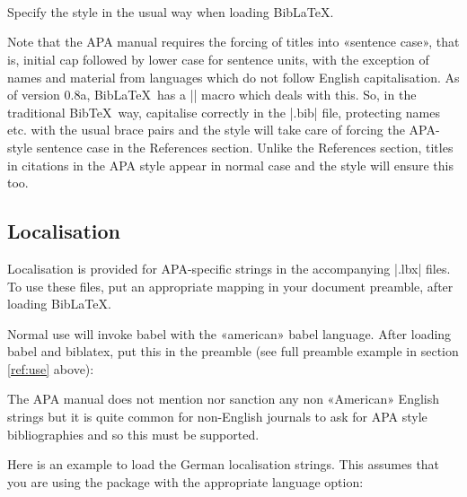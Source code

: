 \documentclass{ltxdockit}
\begin{document}
\noindent{}\\
\\
\\

\noindent Specify the style in the usual way when loading Bib\LaTeX. 

\begin{ltxcode}
\usepackage[american]{babel}
\usepackage{csquotes}
\usepackage[style=apa]{biblatex}
\end{ltxcode}

\noindent Note that the APA manual requires the forcing of titles into
«sentence case», that is, initial cap followed by lower case for sentence
units, with the exception of names and material from languages which do not
follow English capitalisation. As of version 0.8a, Bib\LaTeX\ has a
|\MakeSentenceCase| macro which deals with this. So, in the traditional
Bib\TeX\ way, capitalise correctly in the |.bib| file, protecting names etc.
with the usual brace pairs and the style will take care of forcing the
APA-style sentence case in the References section. Unlike the References
section, titles in citations in the APA style appear in normal case and the
style will ensure this too.

\subsection{Localisation}

Localisation is provided for APA-specific strings in the accompanying
|.lbx| files. To use these files, put an appropriate mapping in your
document preamble, after loading Bib\LaTeX.

Normal use will invoke babel with the «american» babel language. After
loading babel and biblatex, put this in the preamble (see full preamble
example in section \ref{ref:use} above):

\begin{ltxcode}
\end{ltxcode}

The APA manual does not mention nor sanction any non «American» English
strings but it is quite common for non-English journals to ask for APA style
bibliographies and so this must be supported.

Here is an example to load the German localisation strings. This assumes
that you are using the  package with the appropriate language
option:
\end{document}
